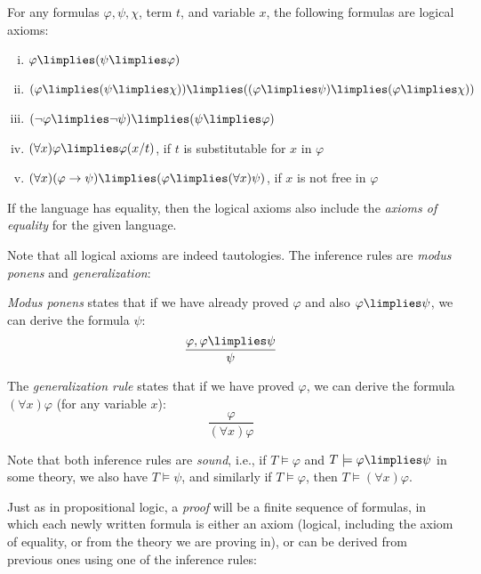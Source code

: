 \begin{definition}
For any formulas $\varphi,\psi,\chi$, term $t$, and variable $x$, the following formulas are logical axioms:
\begin{enumerate}[(i)]
    \item $\varphi \limplies (\psi \limplies \varphi)$
    \item $(\varphi\limplies (\psi \limplies \chi))\limplies ((\varphi \limplies \psi)\limplies(\varphi \limplies \chi))$
    \item $(\neg \varphi \limplies \neg \psi)\limplies(\psi \limplies \varphi)$
    \item $(\forall x)\varphi \limplies \varphi(x/t)$, if $t$ is substitutable for $x$ in $\varphi$
    \item $(\forall x)(\varphi \to \psi) \limplies (\varphi \limplies (\forall x)\psi)$, if $x$ is not free in $\varphi$
\end{enumerate}
If the language has equality, then the logical axioms also include the \emph{axioms of equality} for the given language.       
\end{definition}

Note that all logical axioms are indeed tautologies. The inference rules are \emph{modus ponens} and \emph{generalization}: 

\begin{definition}
\emph{Modus ponens} states that if we have already proved $\varphi$ and also $\varphi\limplies\psi$, we can derive the formula $\psi$:
$$
\frac{\varphi, \varphi \limplies \psi}{\psi}
$$ 
\end{definition}

\begin{definition}
    The \emph{generalization rule} states that if we have proved $\varphi$, we can derive the formula $(\forall x)\varphi$ (for any variable $x$):
    $$
    \frac{\varphi}{(\forall x)\varphi}
    $$ 
\end{definition}

Note that both inference rules are \emph{sound}, i.e., if $T\models\varphi$ and $T\models\varphi\limplies\psi$ in some theory, we also have $T\models\psi$, and similarly if $T\models\varphi$, then $T\models(\forall x)\varphi$.

Just as in propositional logic, a \emph{proof} will be a finite sequence of formulas, in which each newly written formula is either an axiom (logical, including the axiom of equality, or from the theory we are proving in), or can be derived from previous ones using one of the inference rules:

